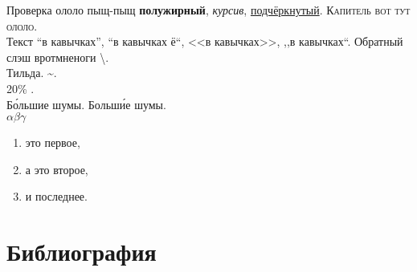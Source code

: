 \documentclass[a4paper,12pt]{report} %
\begin{document}
    \begin{center}
        \begin{minipage}{1\textwidth}
            Проверка ололо пыщ-пыщ \textbf{полужирный}, \textit{курсив}, \underline{подчёркнутый}. \textsc{Капитель вот тут ололо}. \\
            Текст ``в кавычках'', ``в кавычках ё``, <<в кавычках>>, ,,в кавычках``.
            Обратный слэш вротмненоги \textbackslash. \\
            Тильда. \textasciitilde. \\
            20\% .\\
            Б\'{о}льшие шумы. Больш\'{и}е шумы.\\
            $ \alpha \beta \gamma $
        \end{minipage}
    \end{center}
    
    \begin{enumerate}
        \item это первое,
        \item а это второе,
        \item и последнее.
    \end{enumerate}
    
    \chapter*{Библиография}
    
%    
%    
%    
%    
\end{document}
